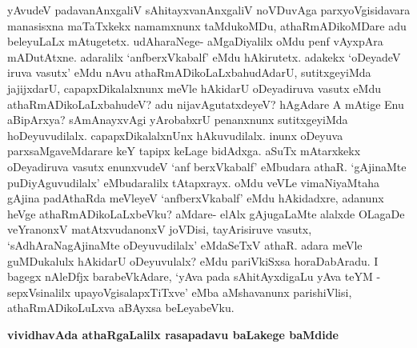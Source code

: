yAvudeV padavanAnxgaliV sAhitayxvanAnxgaliV noVDuvAga parxyoVgisidavara manasisxna maTaTxkekx namamxnunx taMdukoMDu, athaRmADikoMDare adu beleyuLaLx mAtugetetx. udAharaNege- aMgaDiyalilx oMdu penf vAyxpAra mADutAtxne. adaralilx `anfberxVkabalf' eMdu hAkirutetx. adakekx `oDeyadeV iruva vasutx' eMdu nAvu athaRmADikoLaLxbahudAdarU, sutitxgeyiMda jajijxdarU, capapxDikalalxnunx meVle hAkidarU oDeyadiruva vasutx eMdu athaRmADikoLaLxbahudeV? adu nijavAgutatxdeyeV? hAgAdare A mAtige Enu aBipArxya? sAmAnayxvAgi yArobabxrU penanxnunx sutitxgeyiMda hoDeyuvudilalx. capapxDikalalxnUnx hAkuvudilalx. inunx oDeyuva parxsaMgaveMdarare keY tapipx keLage bidAdxga. aSuTx mAtarxkekx oDeyadiruva vasutx enunxvudeV `anf berxVkabalf' eMbudara athaR. `gAjinaMte puDiyAguvudilalx' eMbudaralilx tAtapxrayx. oMdu veVLe vimaNiyaMtaha gAjina padAthaRda meVleyeV `anfberxVkabalf' eMdu hAkidadxre, adanunx heVge athaRmADikoLaLxbeVku? aMdare- elAlx gAjugaLaMte alalxde OLagaDe veYranonxV matAtxvudanonxV joVDisi, tayArisiruve vasutx, `sAdhAraNagAjinaMte oDeyuvudilalx' eMdaSeTxV athaR. adara meVle guMDukalulx hAkidarU oDeyuvulalx? eMdu pariVkiSxsa horaDabAradu. I bagegx nAleDfjx barabeVkAdare, `yAva pada sAhitAyxdigaLu yAva teYM - sepxVsinalilx upayoVgisalapxTiTxve' eMba aMshavanunx parishiVlisi, athaRmADikoLuLxva aBAyxsa beLeyabeVku.

{\bf vividhavAda athaRgaLalilx rasapadavu baLakege baMdide}

